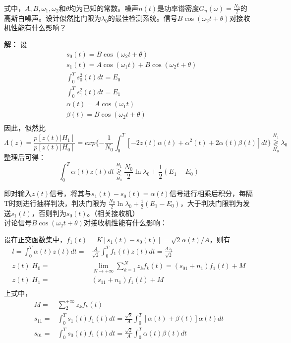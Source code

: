 \documentclass{article}
\begin{document}
\begin{enumerate}[1.]
式中，$ A,B,\omega_1,\omega_2 $和$\theta$均为已知的常数。噪声$n(t)$是功率谱密度$ G_n(\omega)=\frac{N_0}{2} $的高斯白噪声。设计似然比门限为$ \lambda_0 $的最佳检测系统。信号$B\cos (\omega_2 t+\theta)$对接收机性能有什么影响？

\textbf{解：}
设\[
		\begin{aligned}
		&s_0(t)=B\cos (\omega_2 t+\theta)\\
		&s_1(t)=A\cos (\omega_1 t) + B\cos (\omega_2 t+\theta)\\
		&\int_0^Ts_0^2(t)dt=E_0\\
		&\int_0^Ts_1^2(t)dt=E_1\\
		&\alpha(t)=A\cos (\omega_1 t)\\
		&\beta(t)=B\cos (\omega_2 t+\theta)\\
		\end{aligned}
\]
因此，似然比 \[
	\Lambda(z)=\frac{p[z(t)|H_1]}{	p[z(t)|H_0]}=exp\{-\frac{1}{N_0}\int_0^T[-2z(t)\alpha(t)+\alpha^2(t)+2\alpha(t)\beta(t)]dt\}\mathop{\gtrless}\limits_{H_0}^{H_1}\lambda_0
\]	
整理后可得：\[
		\int_0^T\alpha(t)z(t)dt\mathop{\gtrless}\limits_{H_0}^{H_1}\frac{N_0}{2}\ln\lambda_0+\frac{1}{2}(E_1-E_0)
\]

即对输入$z(t)$信号，将其与$ s_1(t)-s_0(t)=\alpha(t) $信号进行相乘后积分，每隔T时刻进行抽样判决，判决门限为 $ 	\frac{N_0}{2}\ln\lambda_0+\frac{1}{2}(E_1-E_0) $，大于判决门限判为发送$ s_1(t) $，否则判为$ s_0(t) $。（相关接收机）\\

讨论信号$B\cos (\omega_2 t+\theta)$对接收机性能有什么影响：

设在正交函数集中，$ f_1(t)=K[s_1(t)-s_0(t)]=\sqrt{2}\alpha(t)/A $，则有 \[
	\begin{aligned}
	l=\int_{0}^T \alpha(t)z(t)dt=&\frac{A}{\sqrt{2}}\int_{0}^T f_1(t)z(t)dt=\frac{Az_1}{\sqrt{2}}\\
	z(t)|H_0=&\underset{N\rightarrow +\infty}{\lim}\sum_{k=1}^{N}z_kf_k(t)=(s_{01}+n_{1})f_1(t)+M\\
	z(t)|H_1=&(s_{11}+n_{1})f_1(t)+M\\
	\end{aligned}	
\]
上式中，\[
	\begin{aligned}
	M=&\sum_{2}^{+\infty}z_kf_k(t) \\
	s_{11}=&\int_0^Ts_1(t)f_1(t)dt = \frac{\sqrt{2}}{A}\int_0^T[\alpha(t)+\beta(t)]\alpha(t)dt\\
	s_{01}=&\int_0^Ts_0(t)f_1(t)dt = \frac{\sqrt{2}}{A}\int_0^T\alpha(t)\beta(t)dt\\
	\end{aligned}
\]


\end{enumerate}
\end{document}
